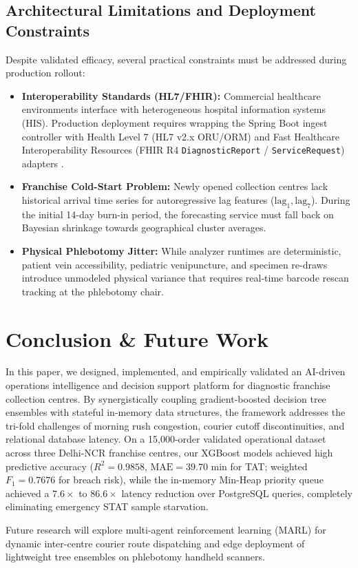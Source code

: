 \documentclass[conference]{IEEEtran}
\begin{document}
\subsection{Architectural Limitations and Deployment Constraints}
Despite validated efficacy, several practical constraints must be addressed during production rollout:
\begin{itemize}
    \item \textbf{Interoperability Standards (HL7/FHIR):} Commercial healthcare environments interface with heterogeneous hospital information systems (HIS). Production deployment requires wrapping the Spring Boot ingest controller with Health Level 7 (HL7 v2.x ORU/ORM) and Fast Healthcare Interoperability Resources (FHIR R4 \texttt{DiagnosticReport} / \texttt{ServiceRequest}) adapters \cite{bender2013hl7,mandel2016smart}.
    \item \textbf{Franchise Cold-Start Problem:} Newly opened collection centres lack historical arrival time series for autoregressive lag features ($\text{lag}_1, \text{lag}_7$). During the initial 14-day burn-in period, the forecasting service must fall back on Bayesian shrinkage towards geographical cluster averages.
    \item \textbf{Physical Phlebotomy Jitter:} While analyzer runtimes are deterministic, patient vein accessibility, pediatric venipuncture, and specimen re-draws introduce unmodeled physical variance that requires real-time barcode rescan tracking at the phlebotomy chair.
\end{itemize}

\section{Conclusion \& Future Work}
In this paper, we designed, implemented, and empirically validated an AI-driven operations intelligence and decision support platform for diagnostic franchise collection centres. By synergistically coupling gradient-boosted decision tree ensembles with stateful in-memory data structures, the framework addresses the tri-fold challenges of morning rush congestion, courier cutoff discontinuities, and relational database latency. On a 15,000-order validated operational dataset across three Delhi-NCR franchise centres, our XGBoost models achieved high predictive accuracy ($R^2 = 0.9858$, $\text{MAE} = 39.70$ min for TAT; weighted $F_1 = 0.7676$ for breach risk), while the in-memory Min-Heap priority queue achieved a $7.6\times$ to $86.6\times$ latency reduction over PostgreSQL queries, completely eliminating emergency STAT sample starvation. 

Future research will explore multi-agent reinforcement learning (MARL) for dynamic inter-centre courier route dispatching and edge deployment of lightweight tree ensembles on phlebotomy handheld scanners.

\balance


\end{document}
